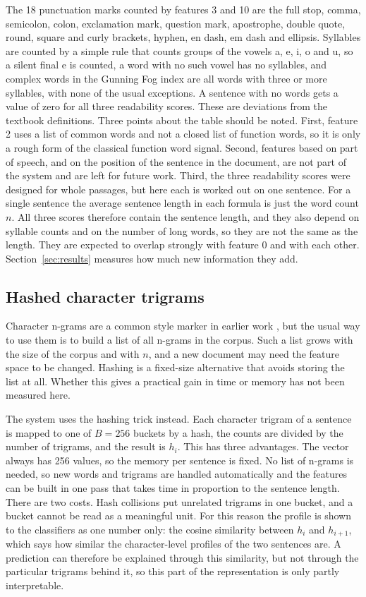 \documentclass[runningheads]{llncs}
\begin{document}
The 18 punctuation marks counted by features 3 and 10 are the full stop, comma, semicolon, colon, exclamation mark, question mark, apostrophe, double quote, round, square and curly brackets, hyphen, en dash, em dash and ellipsis. Syllables are counted by a simple rule that counts groups of the vowels a, e, i, o and u, so a silent final e is counted, a word with no such vowel has no syllables, and complex words in the Gunning Fog index are all words with three or more syllables, with none of the usual exceptions. A sentence with no words gets a value of zero for all three readability scores. These are deviations from the textbook definitions. Three points about the table should be noted. First, feature 2 uses a list of common words and not a closed list of function words, so it is only a rough form of the classical function word signal. Second, features based on part of speech, and on the position of the sentence in the document, are not part of the system and are left for future work. Third, the three readability scores were designed for whole passages, but here each is worked out on one sentence. For a single sentence the average sentence length in each formula is just the word count $n$. All three scores therefore contain the sentence length, and they also depend on syllable counts and on the number of long words, so they are not the same as the length. They are expected to overlap strongly with feature 0 and with each other. Section~\ref{sec:results} measures how much new information they add.

\subsection{Hashed character trigrams}

Character n-grams are a common style marker in earlier work \cite{singh2021writing,rios2022detection,ochab2025styloch}, but the usual way to use them is to build a list of all n-grams in the corpus. Such a list grows with the size of the corpus and with $n$, and a new document may need the feature space to be changed. Hashing is a fixed-size alternative that avoids storing the list at all. Whether this gives a practical gain in time or memory has not been measured here.

The system uses the hashing trick instead. Each character trigram of a sentence is mapped to one of $B=256$ buckets by a hash, the counts are divided by the number of trigrams, and the result is $h_i$. This has three advantages. The vector always has 256 values, so the memory per sentence is fixed. No list of n-grams is needed, so new words and trigrams are handled automatically and the features can be built in one pass that takes time in proportion to the sentence length. There are two costs. Hash collisions put unrelated trigrams in one bucket, and a bucket cannot be read as a meaningful unit. For this reason the profile is shown to the classifiers as one number only: the cosine similarity between $h_i$ and $h_{i+1}$, which says how similar the character-level profiles of the two sentences are. A prediction can therefore be explained through this similarity, but not through the particular trigrams behind it, so this part of the representation is only partly interpretable.
\end{document}
